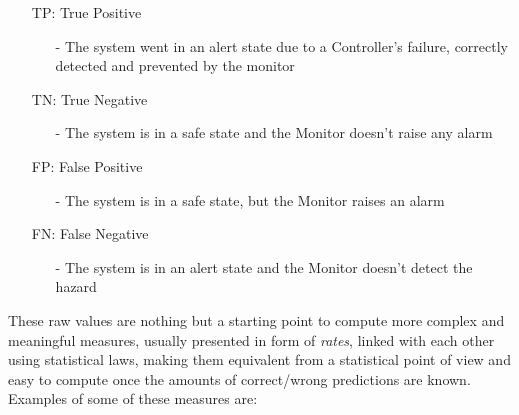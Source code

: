 \begin{itemize}
	\item[TP:] True Positive
	\begin{itemize}
		\item[-] The system went in an alert state due to a Controller's failure, correctly detected and prevented by the monitor
	\end{itemize}
	\item[TN:] True Negative
	\begin{itemize}
		\item[-] The system is in a safe state and the Monitor doesn't raise any alarm
	\end{itemize}
	\item[FP:] False Positive
	\begin{itemize}
		\item[-] The system is in a safe state, but the Monitor raises an alarm
	\end{itemize}
	\item[FN:] False Negative
	\begin{itemize}
		\item[-] The system is in an alert state and the Monitor doesn't detect the hazard
	\end{itemize}
\end{itemize}


\vspace{0.5cm}

These raw values are nothing but a starting point to compute more complex and meaningful measures, usually presented in form of \textsl{rates}, linked with each other using statistical laws, making them equivalent from a statistical point of view and easy to compute once the amounts of correct/wrong predictions are known. Examples of some of these measures are:

